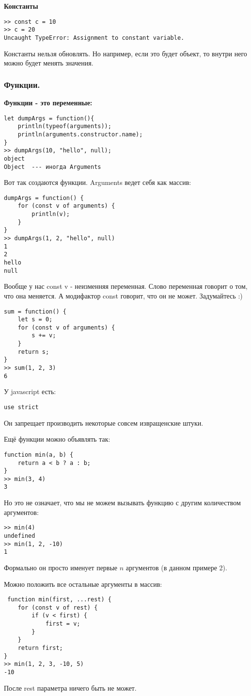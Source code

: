 \textbf{Константы}

\begin{verbatim}
>> const c = 10
>> c = 20
Uncaught TypeError: Assignment to constant variable.
\end{verbatim}
Константы нельзя обновлять. Но например, если это будет объект, то внутри него можно будет менять значения.

\subsubsection{Функции.}


\textbf{Функции - это переменные:}

\begin{verbatim}
let dumpArgs = function(){
    println(typeof(arguments));
    println(arguments.constructor.name);
}
>> dumpArgs(10, "hello", null);
object
Object  --- иногда Arguments
\end{verbatim}
Вот так создаются функции. Arguments ведет себя как массив:

\begin{verbatim}
dumpArgs = function() {
    for (const v of arguments) {
        println(v);
    }
}
>> dumpArgs(1, 2, "hello", null)
1
2
hello
null
\end{verbatim}
Вообще у нас const v - неизменняя переменная. Слово переменная говорит о том, что она меняется. А модифактор const говорит, что он не может. Задумайтесь :)
\begin{verbatim}
sum = function() {
    let s = 0;
    for (const v of arguments) {
        s += v;
    }
    return s;
}
>> sum(1, 2, 3)
6
\end{verbatim}
У javascript есть:
\begin{verbatim}
use strict
\end{verbatim}
Он запрещает производить некоторые совсем извращенские штуки.


Ещё функции можно объявлять так:
\begin{verbatim}
function min(a, b) {
    return a < b ? a : b;
}
>> min(3, 4)
3
\end{verbatim}
Но это не означает, что мы не можем вызывать функцию с другим количеством аргументов:
\begin{verbatim}
>> min(4)
undefined
>> min(1, 2, -10)
1
\end{verbatim}
Формально он просто именует первые $n$ аргументов (в данном примере 2).


Можно положить все остальные аргументы в массив:
\begin{verbatim}
 function min(first, ...rest) {
    for (const v of rest) {
        if (v < first) {
            first = v;
        }
    }
    return first;
}
>> min(1, 2, 3, -10, 5)
-10
\end{verbatim}
После rest параметра ничего быть не может.

